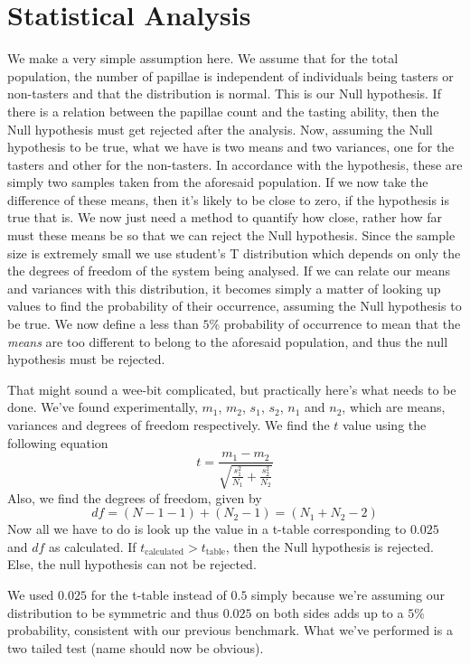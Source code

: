\section{Statistical Analysis}
	We make a very simple assumption here. We assume that for the total population, the number of papillae is independent of individuals being tasters or non-tasters and that the distribution is normal. This is our Null hypothesis. If there is a relation between the papillae count and the tasting ability, then the Null hypothesis must get rejected after the analysis. Now, assuming the Null hypothesis to be true, what we have is two means and two variances, one for the tasters and other for the non-tasters. In accordance with the hypothesis, these are simply two samples taken from the aforesaid population. If we now take the difference of these means, then it's likely to be close to zero, if the hypothesis is true that is. We now just need a method to quantify how close, rather how far must these means be so that we can reject the Null hypothesis. Since the sample size is extremely small we use student's T distribution which depends on only the the degrees of freedom of the system being analysed. If we can relate our means and variances with this distribution, it becomes simply a matter of looking up values to find the probability of their occurrence, assuming the Null hypothesis to be true. We now define a less than $5\%$ probability of occurrence to mean that the \emph{means} are too different to belong to the aforesaid population, and thus the null hypothesis must be rejected.
	\par
	That might sound a wee-bit complicated, but practically here's what needs to be done. We've found experimentally, $m_1$, $m_2$, $s_1$, $s_2$, $n_1$ and $n_2$, which are means, variances and degrees of freedom respectively. We find the $t$ value using the following equation
	\begin{equation}
		t=\frac{m_1 - m_2}{\sqrt{\frac{s_1^2}{N_1} + \frac{s_2^2}{N_2}}}
	\end{equation}
	Also, we find the degrees of freedom, given by
	\begin{equation}
		df = (N-1 -1) + (N_2 -1) = (N_1 + N_2 -2)
	\end{equation}
	Now all we have to do is look up the value in a t-table corresponding to $0.025$ and $df$ as calculated. If $t_\text{calculated}>t_\text{table}$, then the Null hypothesis is rejected. Else, the null hypothesis can not be rejected.
	\par
	We used $0.025$ for the t-table instead of $0.5$ simply because we're assuming our distribution to be symmetric and thus $0.025$ on both sides adds up to a $5\%$ probability, consistent with our previous benchmark. What we've performed is a two tailed test (name should now be obvious).

